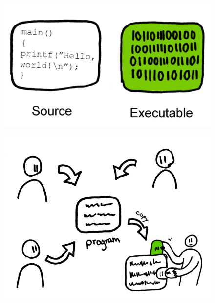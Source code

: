 \documentclass[notes,usenames,dvipsnames]{beamer}       %
\begin{document}
\begin{frame}
  \begin{figure}
    \centering
    \includegraphics[scale=0.3]{img/source-code}
  \end{figure}
\end{frame}

\begin{frame}
  \begin{figure}
    \centering
    \includegraphics[scale=0.8]{img/make-copy}
  \end{figure}
\end{frame}
\end{document}

